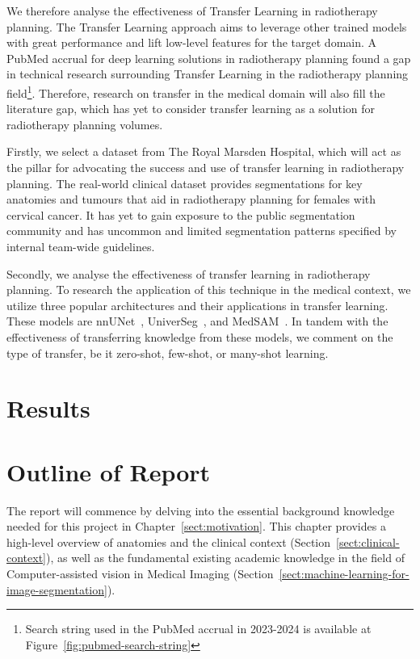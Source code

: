 \documentclass[11pt,twoside]{report}
\begin{document}
We therefore analyse the effectiveness of Transfer Learning in radiotherapy planning. The Transfer Learning approach aims to leverage other trained models with great performance and lift low-level features for the target domain. A PubMed accrual for deep learning solutions in radiotherapy planning found a gap in technical research surrounding Transfer Learning in the radiotherapy planning field\footnote{Search string used in the PubMed accrual in 2023-2024 is available at Figure~\ref{fig:pubmed-search-string}}. Therefore, research on transfer in the medical domain will also fill the literature gap, which has yet to consider transfer learning as a solution for radiotherapy planning volumes. 

Firstly, we select a dataset from The Royal Marsden Hospital, which will act as the pillar for advocating the success and use of transfer learning in radiotherapy planning. The real-world clinical dataset provides segmentations for key anatomies and tumours that aid in radiotherapy planning for females with cervical cancer. It has yet to gain exposure to the public segmentation community and has uncommon and limited segmentation patterns specified by internal team-wide guidelines.

Secondly, we analyse the effectiveness of transfer learning in radiotherapy planning. To research the application of this technique in the medical context, we utilize three popular architectures and their applications in transfer learning. These models are nnUNet~\cite{nnunet}, UniverSeg~\cite{universeg}, and MedSAM~\cite{Ma2024}. In tandem with the effectiveness of transferring knowledge from these models, we comment on the type of transfer, be it zero-shot, few-shot, or many-shot learning.

\section{Results}


\section{Outline of Report}

The report will commence by delving into the essential background knowledge needed for this project in Chapter~\ref{sect:motivation}. This chapter provides a high-level overview of anatomies and the clinical context (Section~\ref{sect:clinical-context}), as well as the fundamental existing academic knowledge in the field of Computer-assisted vision in Medical Imaging (Section~\ref{sect:machine-learning-for-image-segmentation}).
\end{document}
